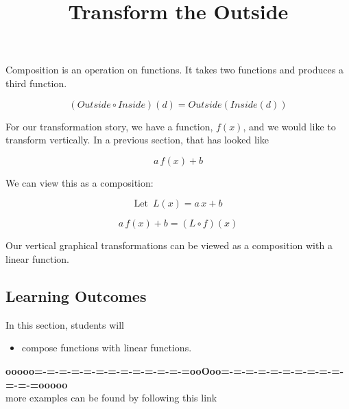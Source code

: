 \documentclass{ximera}
\title{Transform the Outside}
\begin{document}
\begin{abstract}
\end{abstract}
\maketitle









Composition is an operation on functions.  It takes two functions and produces a third function.


\[  (Outside \circ Inside)(d) = Outside(Inside(d))    \]


For our transformation story, we have a function, $f(x)$, and we would like to transform vertically.  In a previous section, that has looked like


\[   a \, f(x) + b  \]


We can view this as a composition:


\[  \text{Let } \, L(x) = a \, x + b   \]


\[   a \, f(x) + b  = (L \circ f)(x)\]



Our vertical graphical transformations can be viewed as a composition with a linear function.





\subsection{Learning Outcomes}



\begin{sectionOutcomes}
In this section, students will 

\begin{itemize}
\item compose functions with linear functions.
\end{itemize}
\end{sectionOutcomes}












\begin{center}
\textbf{\textcolor{green!50!black}{ooooo=-=-=-=-=-=-=-=-=-=-=-=-=ooOoo=-=-=-=-=-=-=-=-=-=-=-=-=ooooo}} \\

more examples can be found by following this link\\ 

\end{center}
\end{document}
